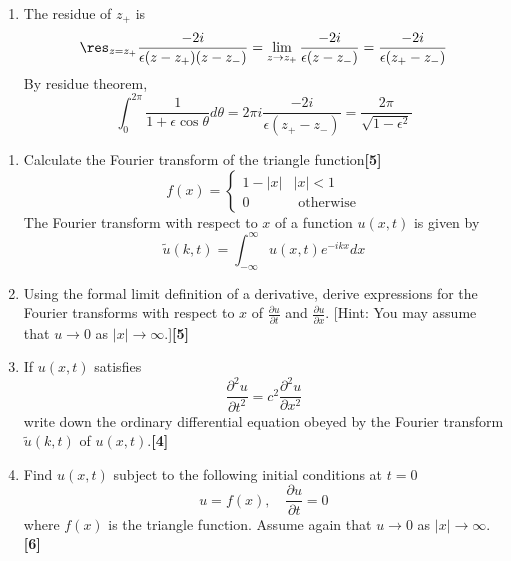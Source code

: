 \documentclass[a4paper]{article}
\begin{document}
\begin{ans}
\begin{enumerate}[label=(\roman*)]
\begin{enumerate}[label=(\alph*)]
\begin{center}
  \end{center}
\item The residue of $z_+$ is
$$\res_{z=z_+}\frac{-2i}{\epsilon(z-z_+)(z-z_-)}=\lim_{z\rightarrow z_+}\frac{-2i}{\epsilon(z-z_-)}=\frac{-2i}{\epsilon(z_+-z_-)}$$
By residue theorem,
$$\int_0^{2\pi}\frac{1}{1+\epsilon\cos\theta}d\theta=2\pi i\frac{-2i}{\epsilon(z_+-z_-)}=\frac{2\pi}{\sqrt{1-\epsilon^2}}$$
\end{enumerate}
\end{enumerate}
\end{ans}
\newpage
\begin{qns}\leavevmode
\begin{enumerate}[label=(\roman*)]
\item Calculate the Fourier transform of the triangle function\hfill\textbf{[5]}
\begin{equation}
   f(x)=
\left\{
        \begin{array}{ll}
      1-|x| & |x|<1 \\
      0 & \text{ otherwise}
        \end{array}
    \right.\tag{*} 
\end{equation}
The Fourier transform with respect to $x$ of a function $u(x, t)$ is given by
$$\tilde{u}(k,t)=\int_{-\infty}^\infty u(x,t)e^{-ikx}dx$$
\item Using the formal limit definition of a derivative, derive expressions for the Fourier transforms with respect to $x$ of $\frac{\partial u}{\partial t}$ and $\frac{\partial u}{\partial x}$. [Hint: You may assume that $u\rightarrow 0$ as $|x|\rightarrow\infty$.]\hfill\textbf{[5]}
\item If $u(x, t)$ satisfies
$$\frac{\partial^2u}{\partial t^2}=c^2\frac{\partial^2u}{\partial x^2}$$
write down the ordinary differential equation obeyed by the Fourier transform $\tilde{u}(k,t)$ of $u(x, t)$.\hfill\textbf{[4]}
\item Find $u(x, t)$ subject to the following initial conditions at $t = 0$
$$u=f(x),\quad \frac{\partial u}{\partial t}=0$$
where $f(x)$ is the triangle function. Assume again that $u\rightarrow 0$ as $|x|\rightarrow\infty$.\hfill\textbf{[6]}
\end{enumerate}
\end{qns}
\end{document}
